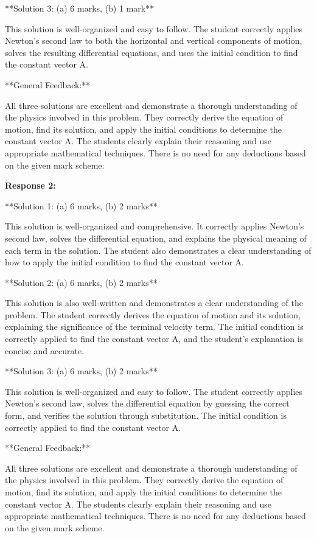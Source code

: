 \documentclass[a4paper,11pt]{article}
\begin{document}
**Solution 3: (a) 6 marks, (b) 1 mark**

This solution is well-organized and easy to follow. The student correctly applies Newton's second law to both the horizontal and vertical components of motion, solves the resulting differential equations, and uses the initial condition to find the constant vector A.

**General Feedback:**

All three solutions are excellent and demonstrate a thorough understanding of the physics involved in this problem. They correctly derive the equation of motion, find its solution, and apply the initial conditions to determine the constant vector A. The students clearly explain their reasoning and use appropriate mathematical techniques. There is no need for any deductions based on the given mark scheme.

\bigskip    
\textbf{Response 2:}

**Solution 1: (a) 6 marks, (b) 2 marks**

This solution is well-organized and comprehensive. It correctly applies Newton's second law, solves the differential equation, and explains the physical meaning of each term in the solution. The student also demonstrates a clear understanding of how to apply the initial condition to find the constant vector A.

**Solution 2: (a) 6 marks, (b) 2 marks**

This solution is also well-written and demonstrates a clear understanding of the problem. The student correctly derives the equation of motion and its solution, explaining the significance of the terminal velocity term. The initial condition is correctly applied to find the constant vector A, and the student's explanation is concise and accurate.

**Solution 3: (a) 6 marks, (b) 2 marks**

This solution is well-organized and easy to follow. The student correctly applies Newton's second law, solves the differential equation by guessing the correct form, and verifies the solution through substitution. The initial condition is correctly applied to find the constant vector A.

**General Feedback:**

All three solutions are excellent and demonstrate a thorough understanding of the physics involved in this problem. They correctly derive the equation of motion, find its solution, and apply the initial conditions to determine the constant vector A. The students clearly explain their reasoning and use appropriate mathematical techniques. There is no need for any deductions based on the given mark scheme.
\end{document}
